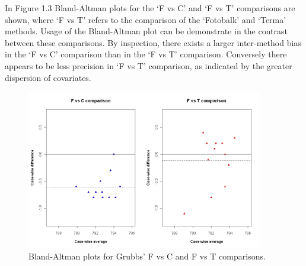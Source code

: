 \documentclass[12pt, a4paper]{report}
\theoremstyle{plain}
\theoremstyle{definition}
\theoremstyle{remark}
\begin{document}
	
	
	In Figure 1.3 Bland-Altman plots for the `F vs C' and `F vs T'
	comparisons are shown, where `F vs T' refers to the comparison of
	the `Fotobalk' and `Terma' methods. Usage of the Bland-Altman plot
	can be demonstrate in the contrast between these comparisons. By inspection, there exists a larger inter-method bias in the `F vs C' comparison than in the `F vs T' comparison. Conversely there
	appears to be less precision in `F vs T' comparison, as indicated
	by the greater dispersion of covariates.
	
	\begin{figure}[h!]
		\begin{center}
			\includegraphics[height=70mm]{images/GrubbsDataTwoBAplots.jpeg}
			\caption{Bland-Altman plots for Grubbs' F vs C and F vs T comparisons.}\label{GrubbsDataTwoBAplots}
		\end{center}
	\end{figure}
	
	\newpage
	
	

	
	

	
	
\end{document}
